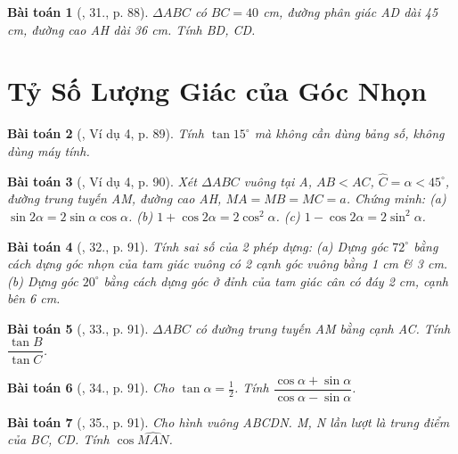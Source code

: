 \documentclass{article}
\newtheorem{baitoan}{Bài toán}
\begin{document}
\begin{baitoan}[\cite{Binh_Toan_9_tap_1}, 31., p. 88]
	$\Delta ABC$ có $BC = 40$ {\rm cm}, đường phân giác AD dài {\rm45 cm}, đường cao AH dài {\rm36 cm}. Tính BD, CD.
\end{baitoan}


\section{Tỷ Số Lượng Giác của Góc Nhọn}

\begin{baitoan}[\cite{Binh_Toan_9_tap_1}, Ví dụ 4, p. 89]
	Tính $\tan15^\circ$ mà không cần dùng bảng số, không dùng máy tính.
\end{baitoan}

\begin{baitoan}[\cite{Binh_Toan_9_tap_1}, Ví dụ 4, p. 90]
	Xét $\Delta ABC$ vuông tại A, $AB < AC$, $\widehat{C} = \alpha  < 45^\circ$, đường trung tuyến AM, đường cao AH, $MA = MB = MC = a$. Chứng minh: (a) $\sin2\alpha = 2\sin\alpha\cos\alpha$. (b) $1 + \cos2\alpha = 2\cos^2\alpha$. (c) $1 - \cos2\alpha = 2\sin^2\alpha$.
\end{baitoan}

\begin{baitoan}[\cite{Binh_Toan_9_tap_1}, 32., p. 91]
	Tính sai số của 2 phép dựng: (a) Dựng góc $72^\circ$ bằng cách dựng góc nhọn của tam giác vuông có 2 cạnh góc vuông bằng {\rm1 cm} \& {\rm3 cm}. (b) Dựng góc $20^\circ$ bằng cách dựng góc ở đỉnh của tam giác cân có đáy {\rm2 cm}, cạnh bên {\rm6 cm}.
\end{baitoan}

\begin{baitoan}[\cite{Binh_Toan_9_tap_1}, 33., p. 91]
	$\Delta ABC$ có đường trung tuyến AM bằng cạnh AC. Tính $\dfrac{\tan B}{\tan C}$.
\end{baitoan}

\begin{baitoan}[\cite{Binh_Toan_9_tap_1}, 34., p. 91]
	Cho $\tan\alpha = \frac{1}{2}$. Tính $\dfrac{\cos\alpha + \sin\alpha}{\cos\alpha - \sin\alpha}$.
\end{baitoan}

\begin{baitoan}[\cite{Binh_Toan_9_tap_1}, 35., p. 91]
	Cho hình vuông ABCDN. M, N lần lượt là trung điểm của BC, CD. Tính $\cos\widehat{MAN}$.
\end{baitoan}
\end{document}
